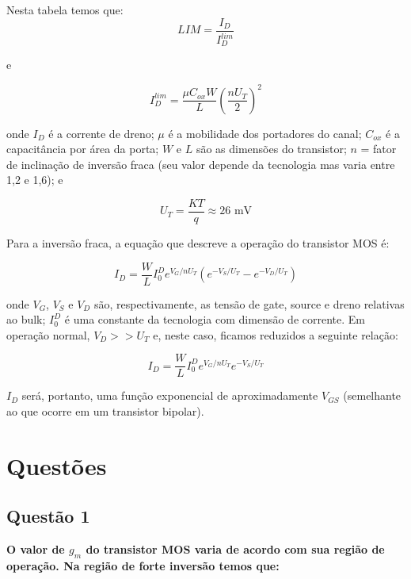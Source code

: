 ﻿\documentclass[12pt,a4paper]{article}
\begin{document}
Nesta tabela temos que:
\begin{equation}
LIM = \frac{I_D}{I_{D}^{lim}}
\end{equation}

e

\begin{equation}
I_{D}^{lim} = \frac{\mu C_{ox} W}{L} \left(\frac{nU_T}{2}\right)^2
\end{equation}

onde $I_D$ é a corrente de dreno; $\mu$ é a mobilidade dos portadores do canal; $C_{ox}$ é a capacitância por área da porta; $W$ e $L$ são as dimensões do transistor; $n$ = fator de inclinação de inversão fraca (seu valor depende da tecnologia mas varia entre 1,2 e 1,6); e

\begin{equation}
U_T = \frac{KT}{q} \approx 26 \text{ mV}
\end{equation}

Para a inversão fraca, a equação que descreve a operação do transistor MOS é:

\begin{equation}
I_D = \frac{W}{L} I_0^D e^{V_G/nU_T} \left( e^{-V_S/U_T} - e^{-V_D/U_T} \right)
\end{equation}

onde $V_G$, $V_S$ e $V_D$ são, respectivamente, as tensão de gate, source e dreno relativas ao bulk; $I_0^D$ é uma constante da tecnologia com dimensão de corrente. Em operação normal, $V_D >> U_T$ e, neste caso, ficamos reduzidos a seguinte relação:

\begin{equation}
I_D = \frac{W}{L} I_0^D e^{V_G/nU_T} e^{-V_S/U_T}
\end{equation}

$I_D$ será, portanto, uma função exponencial de aproximadamente $V_{GS}$ (semelhante ao que ocorre em um transistor bipolar).

\newpage

\section*{Questões}

\subsection*{Questão 1}
\textbf{O valor de $g_m$ do transistor MOS varia de acordo com sua região de operação. Na região de forte inversão temos que:}
\end{document}
